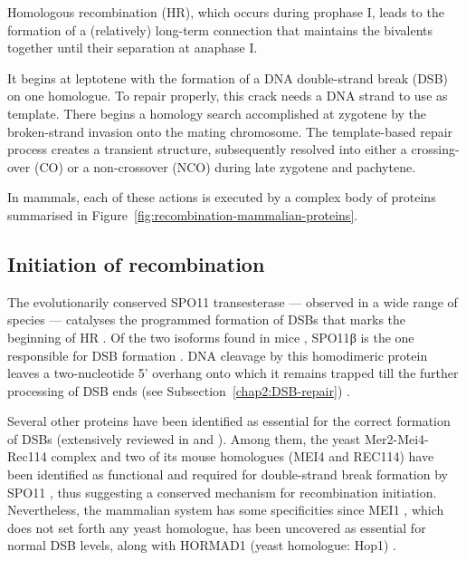 Homologous recombination (HR), which occurs during prophase I, leads to the formation of a (relatively) long-term connection that maintains the bivalents together until their separation at anaphase I\@.

It begins at leptotene with the formation of a DNA double-strand break (DSB) on one homologue. 
To repair properly, this crack needs a DNA strand to use as template. There begins a homology search accomplished at zygotene by the broken-strand invasion onto the mating chromosome.
The template-based repair process creates a transient structure, subsequently resolved into either a crossing-over (CO) or a non-crossover (NCO) during late zygotene and pachytene.

In mammals, each of these actions is executed by a complex body of proteins summarised in Figure~\ref{fig:recombination-mammalian-proteins}. 



\subsection{Initiation of recombination}

The evolutionarily conserved SPO11 transesterase — observed in a wide range of species \citep{baudat2000chromosome,mckim1998meiw68,romanienko2000mouse,steiner2002meiotic,bowring2006chromosome,stacey2006arabidopsis} — catalyses the programmed formation of DSBs \citep{keeney1997meiosisspecific,bergerat1997atypical} that marks the beginning of HR \citep{sun1989double}.
Of the two isoforms found in mice \citep{metzler-guillemain2000identification}, SPO11\textgreek{β} is the one responsible for DSB formation \citep{bellani2010expression}.
DNA cleavage by this homodimeric protein leaves a two-nucleotide 5' overhang \citep{demassy1995nucleotide} onto which it remains trapped till the further processing of DSB ends (see Subsection~\ref{chap2:DSB-repair}) \citep[reviewed in][]{cole2010evolutionary}.

Several other proteins have been identified as essential for the correct formation of DSBs (extensively reviewed in \citealp{keeney2008spo11a} and \citealp{demassy2013initiation}).
Among them, the yeast Mer2-Mei4-Rec114 complex \citep{li2006saccharomyces,maleki2007interactions} and two of its mouse homologues (MEI4 and REC114) have been identified as functional and required for double-strand break formation by SPO11 \citep{kumar2010functional,kumar2015mei4}, thus suggesting a conserved mechanism for recombination initiation. 
Nevertheless, the mammalian system has some specificities since MEI1 \citep{libby2002mouse,libby2003positional}, which does not set forth any yeast homologue, has been uncovered as essential for normal DSB levels, along with HORMAD1 (yeast homologue: Hop1) \citep{shin2010hormad1,daniel2011meiotic}.

